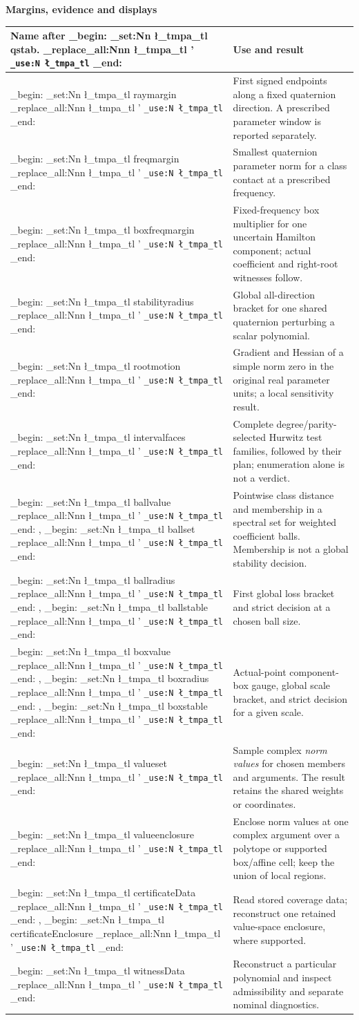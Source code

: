 \documentclass[11pt,a4paper]{article}
\newcommand{\m}[1]{
  \group_begin:
  \tl_set:Nn \l_tmpa_tl {#1}
  \tl_replace_all:Nnn \l_tmpa_tl {'}{\textquotesingle{}}
  \texttt{\tl_use:N \l_tmpa_tl}
  \group_end:
}
\begin{document}
\clearpage
{\Large\bfseries Margins, evidence and displays}\par\medskip
\par\smallskip\noindent\begin{tabularx}{\linewidth}{@{}>{\raggedright\arraybackslash}p{.30\linewidth}Y@{}}\toprule
Name after \m{qstab.} & Use and result\\\midrule
\m{raymargin} & First signed endpoints along a fixed quaternion direction. A prescribed parameter window is reported separately.\\
\m{freqmargin} & Smallest quaternion parameter norm for a class contact at a prescribed frequency.\\
\m{boxfreqmargin} & Fixed-frequency box multiplier for one uncertain Hamilton component; actual coefficient and right-root witnesses follow.\\
\m{stabilityradius} & Global all-direction bracket for one shared quaternion perturbing a scalar polynomial.\\
\m{rootmotion} & Gradient and Hessian of a simple norm zero in the original real parameter units; a local sensitivity result.\\
\m{intervalfaces} & Complete degree/parity-selected Hurwitz test families, followed by their plan; enumeration alone is not a verdict.\\
\m{ballvalue}, \m{ballset} & Pointwise class distance and membership in a spectral set for weighted coefficient balls. Membership is not a global stability decision.\\
\m{ballradius}, \m{ballstable} & First global loss bracket and strict decision at a chosen ball size.\\
\m{boxvalue}, \m{boxradius}, \m{boxstable} & Actual-point component-box gauge, global scale bracket, and strict decision for a given scale.\\
\m{valueset} & Sample complex \emph{norm values} for chosen members and arguments. The result retains the shared weights or coordinates.\\
\m{valueenclosure} & Enclose norm values at one complex argument over a polytope or supported box/affine cell; keep the union of local regions.\\
\m{certificateData}, \m{certificateEnclosure} & Read stored coverage data; reconstruct one retained value-space enclosure, where supported.\\
\m{witnessData} & Reconstruct a particular polynomial and inspect admissibility and separate nominal diagnostics.\\

\end{tabularx}
\end{document}
